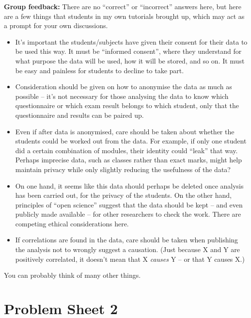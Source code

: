 \documentclass[
  a4paper,
]{book}
\theoremstyle{definition}
\theoremstyle{definition}
\theoremstyle{definition}
\theoremstyle{definition}
\theoremstyle{remark}
\begin{document}
\begin{myanswers}
\textbf{Group feedback:} There are no ``correct'' or ``incorrect'' answers here, but here are a few things that students in my own tutorials brought up, which may act as a prompt for your own discussions.

\begin{itemize}
\item
  It's important the students/subjects have given their consent for their data to be used this way. It must be ``informed consent'', where they understand for what purpose the data will be used, how it will be stored, and so on. It must be easy and painless for students to decline to take part.
\item
  Consideration should be given on how to anonymise the data as much as possible -- it's not necessary for those analysing the data to know which questionnaire or which exam result belongs to which student, only that the questionnaire and results can be paired up.
\item
  Even if after data is anonymised, care should be taken about whether the students could be worked out from the data. For example, if only one student did a certain combination of modules, their identity could ``leak'' that way. Perhaps imprecise data, such as classes rather than exact marks, might help maintain privacy while only slightly reducing the usefulness of the data?
\item
  On one hand, it seems like this data should perhaps be deleted once analysis has been carried out, for the privacy of the students. On the other hand, principles of ``open science'' suggest that the data should be kept -- and even publicly made available -- for other researchers to check the work. There are competing ethical considerations here.
\item
  If correlations are found in the data, care should be taken when publishing the analysis not to wrongly suggest a causation. (Just because X and Y are positively correlated, it doesn't mean that X \emph{causes} Y -- or that Y causes X.)
\end{itemize}

You can probably think of many other things.

\end{myanswers}

\hypertarget{P2-solutions}{%
\section*{Problem Sheet 2}\label{P2-solutions}}
\end{document}
